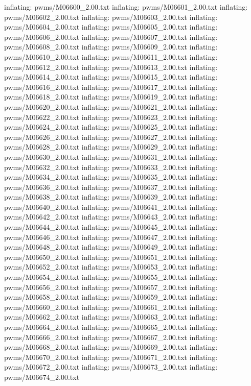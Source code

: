 \documentclass[letterpaper,10pt,english]{sphinxmanual}
\begin{document}
{\begin{sphinxVerbatim}[commandchars=\\\{\}]
  inflating: pwms/M06600\_2.00.txt
  inflating: pwms/M06601\_2.00.txt
  inflating: pwms/M06602\_2.00.txt
  inflating: pwms/M06603\_2.00.txt
  inflating: pwms/M06604\_2.00.txt
  inflating: pwms/M06605\_2.00.txt
  inflating: pwms/M06606\_2.00.txt
  inflating: pwms/M06607\_2.00.txt
  inflating: pwms/M06608\_2.00.txt
  inflating: pwms/M06609\_2.00.txt
  inflating: pwms/M06610\_2.00.txt
  inflating: pwms/M06611\_2.00.txt
  inflating: pwms/M06612\_2.00.txt
  inflating: pwms/M06613\_2.00.txt
  inflating: pwms/M06614\_2.00.txt
  inflating: pwms/M06615\_2.00.txt
  inflating: pwms/M06616\_2.00.txt
  inflating: pwms/M06617\_2.00.txt
  inflating: pwms/M06618\_2.00.txt
  inflating: pwms/M06619\_2.00.txt
  inflating: pwms/M06620\_2.00.txt
  inflating: pwms/M06621\_2.00.txt
  inflating: pwms/M06622\_2.00.txt
  inflating: pwms/M06623\_2.00.txt
  inflating: pwms/M06624\_2.00.txt
  inflating: pwms/M06625\_2.00.txt
  inflating: pwms/M06626\_2.00.txt
  inflating: pwms/M06627\_2.00.txt
  inflating: pwms/M06628\_2.00.txt
  inflating: pwms/M06629\_2.00.txt
  inflating: pwms/M06630\_2.00.txt
  inflating: pwms/M06631\_2.00.txt
  inflating: pwms/M06632\_2.00.txt
  inflating: pwms/M06633\_2.00.txt
  inflating: pwms/M06634\_2.00.txt
  inflating: pwms/M06635\_2.00.txt
  inflating: pwms/M06636\_2.00.txt
  inflating: pwms/M06637\_2.00.txt
  inflating: pwms/M06638\_2.00.txt
  inflating: pwms/M06639\_2.00.txt
  inflating: pwms/M06640\_2.00.txt
  inflating: pwms/M06641\_2.00.txt
  inflating: pwms/M06642\_2.00.txt
  inflating: pwms/M06643\_2.00.txt
  inflating: pwms/M06644\_2.00.txt
  inflating: pwms/M06645\_2.00.txt
  inflating: pwms/M06646\_2.00.txt
  inflating: pwms/M06647\_2.00.txt
  inflating: pwms/M06648\_2.00.txt
  inflating: pwms/M06649\_2.00.txt
  inflating: pwms/M06650\_2.00.txt
  inflating: pwms/M06651\_2.00.txt
  inflating: pwms/M06652\_2.00.txt
  inflating: pwms/M06653\_2.00.txt
  inflating: pwms/M06654\_2.00.txt
  inflating: pwms/M06655\_2.00.txt
  inflating: pwms/M06656\_2.00.txt
  inflating: pwms/M06657\_2.00.txt
  inflating: pwms/M06658\_2.00.txt
  inflating: pwms/M06659\_2.00.txt
  inflating: pwms/M06660\_2.00.txt
  inflating: pwms/M06661\_2.00.txt
  inflating: pwms/M06662\_2.00.txt
  inflating: pwms/M06663\_2.00.txt
  inflating: pwms/M06664\_2.00.txt
  inflating: pwms/M06665\_2.00.txt
  inflating: pwms/M06666\_2.00.txt
  inflating: pwms/M06667\_2.00.txt
  inflating: pwms/M06668\_2.00.txt
  inflating: pwms/M06669\_2.00.txt
  inflating: pwms/M06670\_2.00.txt
  inflating: pwms/M06671\_2.00.txt
  inflating: pwms/M06672\_2.00.txt
  inflating: pwms/M06673\_2.00.txt
  inflating: pwms/M06674\_2.00.txt

\end{sphinxVerbatim}}
\end{document}

